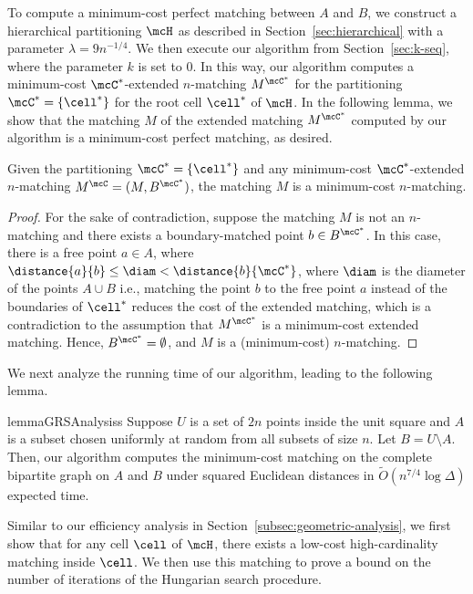%
To compute a minimum-cost perfect matching between $A$ and $B$, we construct a hierarchical partitioning $\mcH$ as described in Section~\ref{sec:hierarchical} with a parameter $\lambda = 9n^{-1/4}$. We then execute our algorithm from Section~\ref{sec:k-seq}, where the parameter $k$ is set to $0$. In this way, our algorithm computes a minimum-cost $\mcC^*$-extended $n$-matching $M^{\mcC^*}$ for the partitioning $\mcC^*=\{\cell^*\}$ for the root cell $\cell^*$ of $\mcH$. In the following lemma, we show that the matching $M$ of the extended matching $M^{\mcC^*}$ computed by our algorithm is a minimum-cost perfect matching, as desired.

\begin{lemma}
    Given the partitioning $\mcC^*=\{\cell^*\}$ and any minimum-cost $\mcC^*$-extended $n$-matching $M^\mcC=(M, B^{\mcC^*})$, the matching $M$ is a minimum-cost $n$-matching.
\end{lemma}
\begin{proof}
    For the sake of contradiction, suppose the matching $M$ is not an $n$-matching and there exists a boundary-matched point $b\in B^{\mcC^*}$. In this case, there is a free point $a\in A$, where $\distance{a}{b}\le \diam <\distance{b}{\mcC^*}$, where $\diam$ is the diameter of the points $A\cup B$ i.e., matching the point $b$ to the free point $a$ instead of the boundaries of $\cell^*$ reduces the cost of the extended matching, which is a contradiction to the assumption that $M^{\mcC^*}$ is a minimum-cost extended matching. Hence, $B^{\mcC^*}=\emptyset$, and $M$ is a (minimum-cost) $n$-matching.
\end{proof}


%



We next analyze the running time of our algorithm, leading to the following lemma.


\begin{restatable}{lemma}{GRSAnalysiss}\label{lemma:GRS-analysis-p2}
    Suppose $U$ is a set of $2n$ points inside the unit square and $A$ is a subset chosen uniformly at random from all subsets of size $n$. Let $B=U\setminus A$.  Then, our algorithm computes the minimum-cost matching on the complete bipartite graph on $A$ and $B$ under squared Euclidean distances in $\tilde{O}(n^{7/4}\log \Delta)$ expected time.
\end{restatable} 

%
%
%

Similar to our efficiency analysis in Section~\ref{subsec:geometric-analysis}, we first show that for any cell $\cell$ of $\mcH$, there exists a low-cost high-cardinality matching inside $\cell$. We then use this matching to prove a bound on the number of iterations of the Hungarian search procedure.






